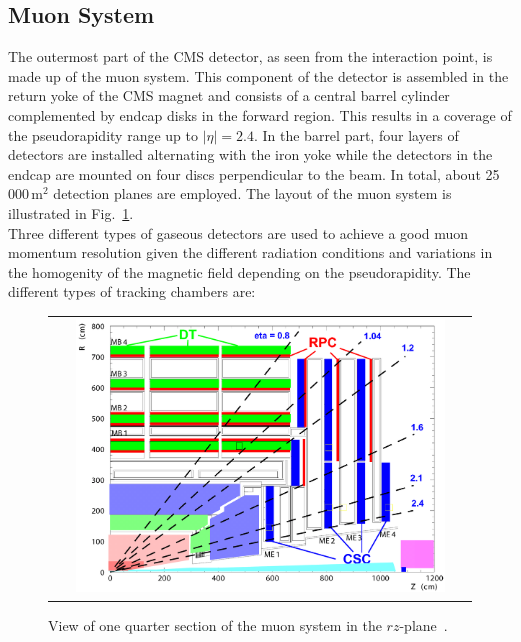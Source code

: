 \subsection{Muon System}
\label{subsec:cms_muon}
The outermost part of the CMS detector, as seen from the interaction point, is made up of the muon system. This component of the detector is assembled in the return yoke of the CMS magnet and consists of a central barrel cylinder complemented by endcap disks in the forward region. This results in a coverage of the pseudorapidity range up to $|\eta| = 2.4$. In the barrel part, four layers of detectors are installed alternating with the iron yoke while the detectors in the endcap are mounted on four discs perpendicular to the beam. In total, about 25\,000\,$\mathrm{m}^2$ detection planes are employed. The layout of the muon system is illustrated in Fig.~\ref{fig:CMS_muon}. \\
Three different types of gaseous detectors are used to achieve a good muon momentum resolution given the different radiation conditions and variations in the homogenity of the magnetic field depending on the pseudorapidity. The different types of tracking chambers are:
\begin{figure}[!tp]
  \centering
  \begin{tabular}{c}
    \includegraphics[width=0.9\textwidth]{figures/Figures_Experimental_Apparatus_MuonDetector.png}
  \end{tabular}
  \caption{View of one quarter section of the muon system in the $rz$-plane~\cite{bib:cmsptdr1}.}
  \label{fig:CMS_muon}
\end{figure}

